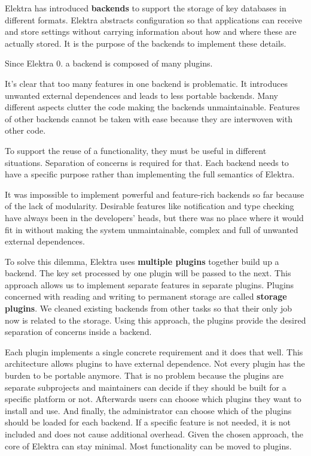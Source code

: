 Elektra has introduced {\bfseries backends} to support the storage of key databases in different formats. Elektra abstracts configuration so that applications can receive and store settings without carrying information about how and where these are actually stored. It is the purpose of the backends to implement these details.

Since Elektra 0. a backend is composed of many plugins.

It's clear that too many features in one backend is problematic. It introduces unwanted external dependences and leads to less portable backends. Many different aspects clutter the code making the backends unmaintainable. Features of other backends cannot be taken with ease because they are interwoven with other code.

To support the reuse of a functionality, they must be useful in different situations. Separation of concerns is required for that. Each backend needs to have a specific purpose rather than implementing the full semantics of Elektra.

It was impossible to implement powerful and feature-\/rich backends so far because of the lack of modularity. Desirable features like notification and type checking have always been in the developers' heads, but there was no place where it would fit in without making the system unmaintainable, complex and full of unwanted external dependences.

To solve this dilemma, Elektra uses {\bfseries multiple plugins} together build up a backend. The key set processed by one plugin will be passed to the next. This approach allows us to implement separate features in separate plugins. Plugins concerned with reading and writing to permanent storage are called {\bfseries storage plugins}. We cleaned existing backends from other tasks so that their only job now is related to the storage. Using this approach, the plugins provide the desired separation of concerns inside a backend.

Each plugin implements a single concrete requirement and it does that well. This architecture allows plugins to have external dependence. Not every plugin has the burden to be portable anymore. That is no problem because the plugins are separate subprojects and maintainers can decide if they should be built for a specific platform or not. Afterwards users can choose which plugins they want to install and use. And finally, the administrator can choose which of the plugins should be loaded for each backend. If a specific feature is not needed, it is not included and does not cause additional overhead. Given the chosen approach, the core of Elektra can stay minimal. Most functionality can be moved to plugins.

